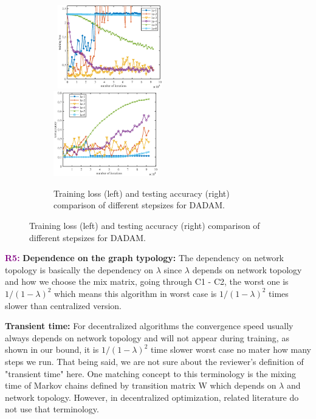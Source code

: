 \documentclass{article}
\begin{document}
\begin{figure}
\begin{minipage}{\linewidth}
\vspace{-0.45in}
\begin{figure}[H]
    \begin{center}
\mbox{
	\includegraphics[width=0.5\textwidth]{figures/adam_train.eps}
	\includegraphics[width=0.5\textwidth]{figures/adam_test.eps}
	}
    \end{center}\vspace{-0.1in}
	\caption{Training loss (left) and testing accuracy (right) comparison of different stepsizes for DADAM.}
	\label{fig: stepsize}
\end{figure}
\end{minipage}\end{figure}


\textbf{\textcolor{purple}{R5:}} 
\textbf{Dependence on the graph typology:} 
The dependency on network topology is basically the dependency on $\lambda$ since $\lambda$ depends on network topology and how we choose the mix matrix, going through C1 - C2, the worst one is $1/(1- \lambda)^2$ which means this algorithm in worst case is $1/(1- \lambda)^2$ times slower than centralized version.


\textbf{Transient time:}  For decentralized algorithms the convergence speed usually always depends on network topology and will not appear during training, as shown in our bound, it is $1/(1- \lambda)^2$ time slower worst case no mater how many steps we run.  
That being said, we are not sure about the reviewer's definition of "transient time" here.
 One matching concept to this terminology is the mixing time of Markov chains defined by transition matrix W which depends on $\lambda$ and network topology. However, in decentralized optimization, related literature do not use that terminology.
\end{document}
